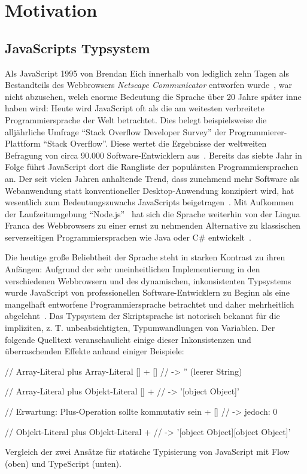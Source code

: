 \chapter{Motivation}

\section{JavaScripts Typsystem}

Als JavaScript 1995 von Brendan Eich innerhalb von lediglich zehn Tagen als Bestandteils des Webbrowsers \textit{Netscape Communicator} entworfen wurde~\autocite{severance:2012:js10days}, war nicht abzusehen, welch enorme Bedeutung die Sprache über 20 Jahre später inne haben wird: Heute wird JavaScript oft als die am weitesten verbreitete Programmiersprache der Welt betrachtet. Dies belegt beispielsweise die alljährliche Umfrage \enquote{Stack Overflow Developer Survey} der Programmierer-Plattform \enquote{Stack Overflow}. Diese wertet die Ergebnisse der weltweiten Befragung von circa 90.000 Software-Entwicklern aus~\autocite{stackoverflow:survey:2019}. Bereits das siebte Jahr in Folge führt JavaScript dort die Rangliste der populärsten Programmiersprachen an.
Der seit vielen Jahren anhaltende Trend, dass zunehmend mehr Software als Webanwendung statt konventioneller Desktop-Anwendung konzipiert wird, hat wesentlich zum Bedeutungszuwachs JavaScripts beigetragen~\autocite{taivalsaari:2017}\autocite{casteleyn:2014:ria}. Mit Aufkommen der Laufzeitumgebung \enquote{Node.js}~\autocite{nodejs} hat sich die Sprache weiterhin von der Lingua Franca des Webbrowsers zu einer ernst zu nehmenden Alternative zu klassischen serverseitigen Programmiersprachen wie Java oder C\# entwickelt~\autocite{tilkov:nodejs}.

Die heutige große Beliebtheit der Sprache steht in starken Kontrast zu ihren Anfängen: Aufgrund der sehr uneinheitlichen Implementierung in den verschiedenen Webbrowsern und des dynamischen, inkonsistenten Typsystems wurde JavaScript von professionellen Software-Entwicklern zu Beginn als eine mangelhaft entworfene Programmiersprache betrachtet und daher mehrheitlich abgelehnt~\autocite{oreilly:2001:js}. Das Typsystem der Skriptsprache ist notorisch bekannt für die impliziten, z. T. unbeabsichtigten, Typumwandlungen von Variablen. Der folgende Quelltext veranschaulicht einige dieser Inkonsistenzen und überraschenden Effekte anhand einiger Beispiele:

\bigskip
\begin{listing}[!h]
\begin{jscode}
// Array-Literal plus Array-Literal
[] + []  // -> '' (leerer String)

// Array-Literal plus Objekt-Literal
[] + {}  // -> '[object Object]'

// Erwartung: Plus-Operation sollte kommutativ sein
{} + []  // -> jedoch: 0

// Objekt-Literal plus Objekt-Literal
{} + {}  // -> '[object Object][object Object]'
\end{jscode}
\caption{Vergleich der zwei Ansätze für statische Typisierung von JavaScript mit Flow (oben) und TypeScript (unten).}
\label{code:example}
\end{listing}



